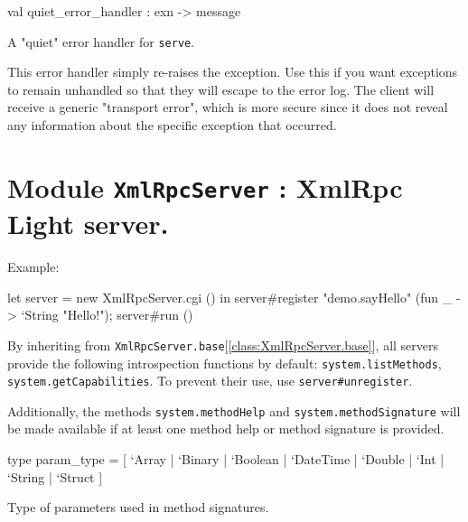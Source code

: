 \documentclass[11pt]{article}
\begin{document}
\label{val:XmlRpc.quiet-underscoreerror-underscorehandler}\begin{ocamldoccode}
val quiet_error_handler : exn -> message
\end{ocamldoccode}
\begin{ocamldocdescription}
A "quiet" error handler for {\tt{serve}}.


    This error handler simply re-raises the exception. Use this if you
    want exceptions to remain unhandled so that they will escape to the
    error log. The client will receive a generic "transport error",
    which is more secure since it does not reveal any information about
    the specific exception that occurred.


\end{ocamldocdescription}


\section{Module {\tt{XmlRpcServer}} : XmlRpc Light server.}
\label{module:XmlRpcServer}




\ocamldocvspace{0.5cm}



Example: \begin{ocamldoccode}

    let server = new XmlRpcServer.cgi () in
    server#register "demo.sayHello"
      (fun _ -> `String "Hello!");
    server#run () 
\end{ocamldoccode}



    By inheriting from {\tt{XmlRpcServer.base}}[\ref{class:XmlRpcServer.base}], all servers provide
    the following introspection functions by default: {\tt{system.listMethods}},
    {\tt{system.getCapabilities}}. To prevent their use, use {\tt{server\verb`#`unregister}}.


    Additionally, the methods {\tt{system.methodHelp}} and {\tt{system.methodSignature}}
    will be made available if at least one method help or method signature is
    provided.



\label{type:XmlRpcServer.param-underscoretype}\begin{ocamldoccode}
type param_type = [ `Array
  | `Binary
  | `Boolean
  | `DateTime
  | `Double
  | `Int
  | `String
  | `Struct ] 
\end{ocamldoccode}
\begin{ocamldocdescription}
Type of parameters used in method signatures.


\end{ocamldocdescription}
\end{document}
